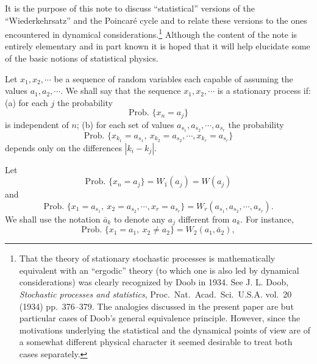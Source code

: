 \documentclass[11pt]{article}
\begin{document}
\setcounter{page}{1002}
 It is the purpose of this note to discuss ``statistical'' versions of the ``Wiederkehrsatz'' and the Poincar\'e cycle and to relate these versions to the ones encountered in dynamical considerations.\footnote{That the theory of stationary stochastic processes is mathematically equivalent with an ``ergodic'' theory (to which one is also led by dynamical considerations) was clearly recognized by Doob in 1934. See J. L. Doob, \emph{Stochastic processes and statistics}, Proc.\ Nat.\ Acad.\ Sci.\ U.S.A. vol.~20 (1934) pp.~376--379. The analogies discussed in the present paper are but particular cases of Doob's general equivalence principle. However, since the motivations underlying the statistical and the dynamical points of view are of a somewhat different physical character it seemed desirable to treat both cases separately.} Although the content of the note is entirely elementary and in part known it is hoped that it will help elucidate some of the basic notions of statistical physics.

\medskip
{} Let $x_1, x_2, \cdots$ be a sequence of random variables each capable of assuming the values $a_1, a_2, \cdots$. We shall say that the sequence $x_1, x_2, \cdots$ is a stationary process if: (a) for each $j$ the probability
\[
\text{Prob.\ } \{x_n = a_j\}
\]
is independent of $n$; (b) for each set of values $a_{s_1}, a_{s_2}, \cdots, a_{s_r}$ the probability
\[
\text{Prob.\ } \{x_{k_1} = a_{s_1},\ x_{k_2} = a_{s_2}, \cdots, x_{k_r} = a_{s_r}\}
\]
depends only on the differences $|k_i - k_j|$.

Let
\[
\text{Prob.\ } \{x_n = a_j\} = W_1(a_j) = W(a_j)
\]
and
\[
\text{Prob.\ } \{x_1 = a_{s_1},\ x_2 = a_{s_2}, \cdots, x_r = a_{s_r}\} = W_r(a_{s_1}, a_{s_2}, \cdots, a_{s_r}).
\]
We shall use the notation $\bar a_k$ to denote any $a_j$ different from $a_k$. For instance,
\[
\text{Prob.\ } \{x_1 = a_1,\ x_2 \neq a_2\} = W_2(a_1, \bar a_2),
\]
\end{document}

